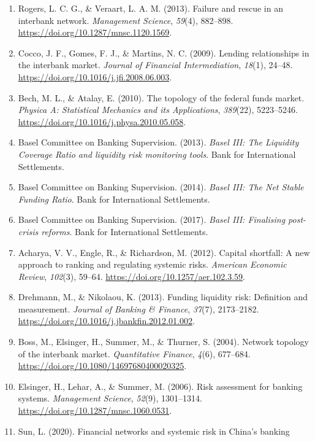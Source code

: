 \begin{enumerate}
  383--399.
  \url{https://doi.org/10.1016/j.jbankfin.2014.02.006}.
\item
  Rogers, L. C. G., \& Veraart, L. A. M. (2013). Failure and rescue in
  an interbank network. \textit{Management Science}, \textit{59}(4),
  882--898.
  \url{https://doi.org/10.1287/mnsc.1120.1569}.
\item
  Cocco, J. F., Gomes, F. J., \& Martins, N. C. (2009). Lending
  relationships in the interbank market. \textit{Journal of Financial
  Intermediation}, \textit{18}(1), 24--48.
  \url{https://doi.org/10.1016/j.jfi.2008.06.003}.
\item
  Bech, M. L., \& Atalay, E. (2010). The topology of the federal funds
  market. \textit{Physica A: Statistical Mechanics and its Applications},
  \textit{389}(22), 5223--5246.
  \url{https://doi.org/10.1016/j.physa.2010.05.058}.
\item
  Basel Committee on Banking Supervision. (2013). \textit{Basel III: The
  Liquidity Coverage Ratio and liquidity risk monitoring tools}. Bank for
  International Settlements.
\item
  Basel Committee on Banking Supervision. (2014). \textit{Basel III: The
  Net Stable Funding Ratio}. Bank for International Settlements.
\item
  Basel Committee on Banking Supervision. (2017). \textit{Basel III:
  Finalising post-crisis reforms}. Bank for International Settlements.
\item
  Acharya, V. V., Engle, R., \& Richardson, M. (2012). Capital
  shortfall: A new approach to ranking and regulating systemic risks.
  \textit{American Economic Review}, \textit{102}(3), 59--64.
  \url{https://doi.org/10.1257/aer.102.3.59}.
\item
  Drehmann, M., \& Nikolaou, K. (2013). Funding liquidity risk:
  Definition and measurement. \textit{Journal of Banking \& Finance},
  \textit{37}(7), 2173--2182.
  \url{https://doi.org/10.1016/j.jbankfin.2012.01.002}.
\item
  Boss, M., Elsinger, H., Summer, M., \& Thurner, S. (2004). Network
  topology of the interbank market. \textit{Quantitative Finance},
  \textit{4}(6), 677--684.
  \url{https://doi.org/10.1080/14697680400020325}.
\item
  Elsinger, H., Lehar, A., \& Summer, M. (2006). Risk assessment for
  banking systems. \textit{Management Science}, \textit{52}(9),
  1301--1314.
  \url{https://doi.org/10.1287/mnsc.1060.0531}.
\item
  Sun, L. (2020). Financial networks and systemic risk in China's banking

\end{enumerate}
